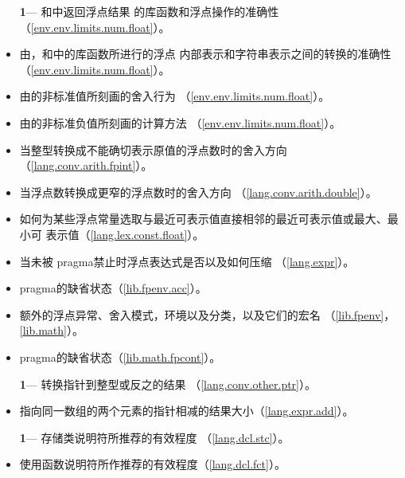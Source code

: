 \begin{itemize} %
  \item[\textbf{1}\hspace{5pt}---]{和中返回浮点结果
    的库函数和浮点操作的准确性（\ref{env.env.limits.num.float}）。}
  \item{由，和中的库函数所进行的浮点
    内部表示和字符串表示之间的转换的准确性（\ref{env.env.limits.num.float}）。}
  \item{由的非标准值所刻画的舍入行为
    （\ref{env.env.limits.num.float}）。}
  \item{由的非标准负值所刻画的计算方法
    （\ref{env.env.limits.num.float}）。}
  \item{当整型转换成不能确切表示原值的浮点数时的舍入方向
    （\ref{lang.conv.arith.fpint}）。}
  \item{当浮点数转换成更窄的浮点数时的舍入方向
    （\ref{lang.conv.arith.double}）。}
  \item{如何为某些浮点常量选取与最近可表示值直接相邻的最近可表示值或最大、最小可
    表示值（\ref{lang.lex.const.float}）。}
  \item{当未被 pragma禁止时浮点表达式是否以及如何压缩
    （\ref{lang.expr}）。}
  \item{ pragma的缺省状态（\ref{lib.fpenv.acc}）。}
  \item{额外的浮点异常、舍入模式，环境以及分类，以及它们的宏名
    （\ref{lib.fpenv}，\ref{lib.math}）。}
  \item{ pragma的缺省状态（\ref{lib.math.fpcont}）。}
\end{itemize}

\begin{itemize}
  \item[\textbf{1}\hspace{5pt}---]{转换指针到整型或反之的结果
    （\ref{lang.conv.other.ptr}）。}
  \item{指向同一数组的两个元素的指针相减的结果大小（\ref{lang.expr.add}）。}
\end{itemize}

\begin{itemize}
  \item[\textbf{1}\hspace{5pt}---]{存储类说明符所推荐的有效程度
    （\ref{lang.dcl.stc}）。}
  \item{使用函数说明符所作推荐的有效程度（\ref{lang.dcl.fct}）。}
\end{itemize}

